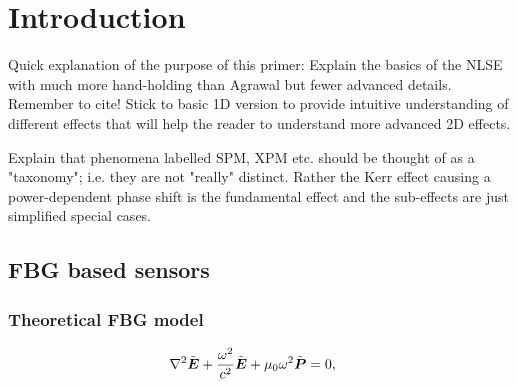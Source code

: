 \chapter{Introduction}
\label{ch:Introduction}

Quick explanation of the purpose of this primer: Explain the basics of the NLSE with much more hand-holding than Agrawal but fewer advanced details. Remember to cite! Stick to basic 1D version to provide intuitive understanding of different effects that will help the reader to understand more advanced 2D effects.  

Explain that phenomena labelled SPM, XPM etc. should be thought of as a "taxonomy"; i.e. they are not "really" distinct. Rather the Kerr effect causing a power-dependent phase shift is the fundamental effect and the sub-effects are just simplified special cases.  

\section{FBG based sensors}

\subsection{Theoretical FBG model}

\begin{align}
    \nabla^{2}\tilde{\boldsymbol{E}}+\frac{\omega^{2}}{c^{2}}\tilde{\boldsymbol{E}}+\text{\ensuremath{\mu_{0}}}\omega^{2}\tilde{\boldsymbol{P}}&=0,
\end{align}